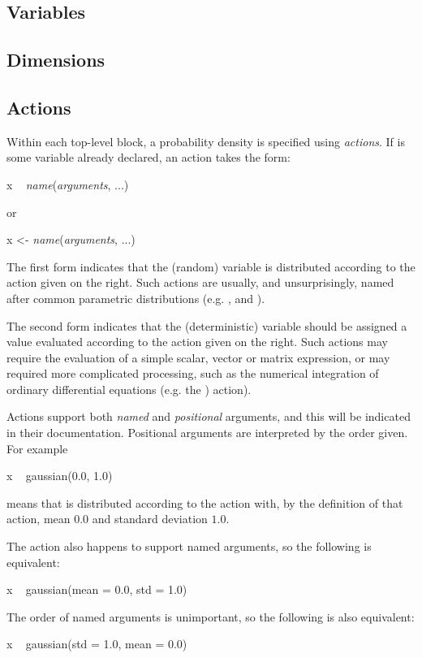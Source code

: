 \subsection{Variables\label{Variables}}

\subsection{Dimensions\label{Dimensions}}


\subsection{Actions\label{Actions}}

Within each top-level block, a probability density is specified using
\emph{actions}. If  is some variable already declared, an action
takes the form:
\begin{bicode}
x ~ \textsl{name}(\textsl{arguments}, ...)
\end{bicode}
or
\begin{bicode}
x <- \textsl{name}(\textsl{arguments}, ...)
\end{bicode}

The first form indicates that the (random) variable  is distributed
according to the action given on the right. Such actions are usually, and
unsurprisingly, named after common parametric distributions (e.g.
,  and ).

The second form indicates that the (deterministic) variable  should
be assigned a value evaluated according to the action given on the right. Such
actions may require the evaluation of a simple scalar, vector or matrix
expression, or may required more complicated processing, such as the numerical
integration of ordinary differential equations (e.g. the ) action).

Actions support both \emph{named} and \emph{positional}
arguments, and this will be indicated in their
documentation. Positional arguments are interpreted by the order given. For
example
\begin{bicode}
x ~ gaussian(0.0, 1.0)
\end{bicode}
means that  is distributed according to the 
action with, by the definition of that action, mean $0.0$ and standard
deviation $1.0$.

The  action also happens to support named arguments, so
the following is equivalent:
\begin{bicode}
x ~ gaussian(mean = 0.0, std = 1.0)
\end{bicode}
The order of named arguments is unimportant, so the following is also
equivalent:
\begin{bicode}
x ~ gaussian(std = 1.0, mean = 0.0)
\end{bicode}

